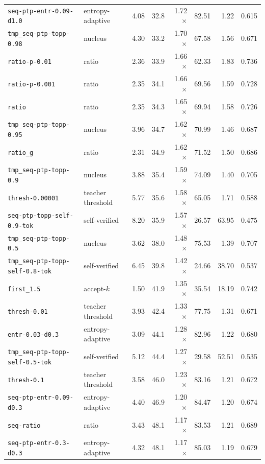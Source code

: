 {\begin{tabular}{llrrrrrr}
\texttt{seq-ptp-entr-0.09-d1.0} & entropy-adaptive & 4.08 & 32.8 & 1.72$\times$ & 82.51 & 1.22 & 0.615 \\
\texttt{tmp\_seq-ptp-topp-0.98} & nucleus & 4.30 & 33.2 & 1.70$\times$ & 67.58 & 1.56 & 0.671 \\
\texttt{ratio-p-0.01} & ratio & 2.36 & 33.9 & 1.66$\times$ & 62.33 & 1.83 & 0.736 \\
\texttt{ratio-p-0.001} & ratio & 2.35 & 34.1 & 1.66$\times$ & 69.56 & 1.59 & 0.728 \\
\texttt{ratio} & ratio & 2.35 & 34.3 & 1.65$\times$ & 69.94 & 1.58 & 0.726 \\
\texttt{tmp\_seq-ptp-topp-0.95} & nucleus & 3.96 & 34.7 & 1.62$\times$ & 70.99 & 1.46 & 0.687 \\
\texttt{ratio\_g} & ratio & 2.31 & 34.9 & 1.62$\times$ & 71.52 & 1.50 & 0.686 \\
\texttt{tmp\_seq-ptp-topp-0.9} & nucleus & 3.88 & 35.4 & 1.59$\times$ & 74.09 & 1.40 & 0.705 \\
\texttt{thresh-0.00001} & teacher threshold & 5.77 & 35.6 & 1.58$\times$ & 65.05 & 1.71 & 0.588 \\
\texttt{seq-ptp-topp-self-0.9-tok} & self-verified & 8.20 & 35.9 & 1.57$\times$ & 26.57 & 63.95 & 0.475 \\
\texttt{tmp\_seq-ptp-topp-0.5} & nucleus & 3.62 & 38.0 & 1.48$\times$ & 75.53 & 1.39 & 0.707 \\
\texttt{tmp\_seq-ptp-topp-self-0.8-tok} & self-verified & 6.45 & 39.8 & 1.42$\times$ & 24.66 & 38.70 & 0.537 \\
\texttt{first\_1.5} & accept-$k$ & 1.50 & 41.9 & 1.35$\times$ & 35.54 & 18.19 & 0.742 \\
\texttt{thresh-0.01} & teacher threshold & 3.93 & 42.4 & 1.33$\times$ & 77.75 & 1.31 & 0.671 \\
\texttt{entr-0.03-d0.3} & entropy-adaptive & 3.09 & 44.1 & 1.28$\times$ & 82.96 & 1.22 & 0.680 \\
\texttt{tmp\_seq-ptp-topp-self-0.5-tok} & self-verified & 5.12 & 44.4 & 1.27$\times$ & 29.58 & 52.51 & 0.535 \\
\texttt{thresh-0.1} & teacher threshold & 3.58 & 46.0 & 1.23$\times$ & 83.16 & 1.21 & 0.672 \\
\texttt{seq-ptp-entr-0.09-d0.3} & entropy-adaptive & 4.40 & 46.9 & 1.20$\times$ & 84.47 & 1.20 & 0.674 \\
\texttt{seq-ratio} & ratio & 3.43 & 48.1 & 1.17$\times$ & 83.53 & 1.21 & 0.689 \\
\texttt{seq-ptp-entr-0.3-d0.3} & entropy-adaptive & 4.32 & 48.1 & 1.17$\times$ & 85.03 & 1.19 & 0.679 \\

\end{tabular}}
